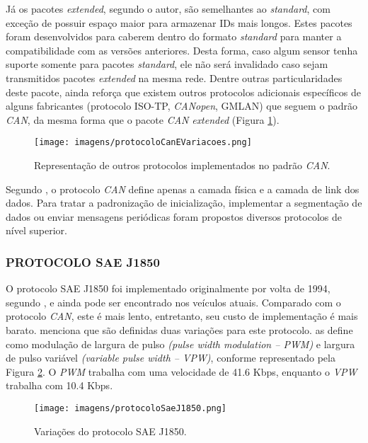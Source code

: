 Já os pacotes \textit{extended}, segundo o autor, são semelhantes ao \textit{standard}, com exceção de possuir espaço maior para armazenar IDs mais longos. Estes pacotes foram desenvolvidos para caberem dentro do formato \textit{standard} para manter a compatibilidade com as versões anteriores. Desta forma, caso algum sensor tenha suporte somente para pacotes \textit{standard}, ele não será invalidado caso sejam transmitidos pacotes \textit{extended} na mesma rede. Dentre outras particularidades deste pacote,  ainda reforça que existem outros protocolos adicionais específicos de alguns fabricantes (protocolo ISO-TP, \textit{CANopen}, GMLAN) que seguem o padrão \textit{CAN}, da mesma forma que o pacote \textit{CAN} \textit{extended} (Figura \ref{Fig:implementacoes_can}).

\begin{figure}[!ht]
\centering
\caption{Representação de outros protocolos implementados no padrão \textit{CAN}.} 
{\texttt{[image: imagens/protocoloCanEVariacoes.png]}}\\
 \label{Fig:implementacoes_can}
\end{figure}

Segundo , o protocolo \textit{CAN} define apenas a camada física e a camada de link dos dados. Para tratar a padronização de inicialização, implementar a segmentação de dados ou enviar mensagens periódicas foram propostos diversos protocolos de nível superior.

\subsubsection{PROTOCOLO SAE J1850}
O protocolo SAE J1850 foi implementado originalmente por volta de 1994, segundo , e ainda pode ser encontrado nos veículos atuais. Comparado com o protocolo \textit{CAN}, este é mais lento, entretanto, seu custo de implementação é mais barato.  menciona que são definidas duas variações para este protocolo.  as define como modulação de largura de pulso \textit{(pulse width modulation – PWM)} e largura de pulso variável \textit{(variable pulse width – VPW)}, conforme representado pela Figura \ref{Fig:implementacoes_saej1850}. O \textit{PWM} trabalha com uma velocidade de 41.6 Kbps, enquanto o \textit{VPW} trabalha com 10.4 Kbps.

\begin{figure}[!ht]
\centering
\caption{Variações do protocolo SAE J1850.} 
{\texttt{[image: imagens/protocoloSaeJ1850.png]}}\\
 \label{Fig:implementacoes_saej1850}
\end{figure}

